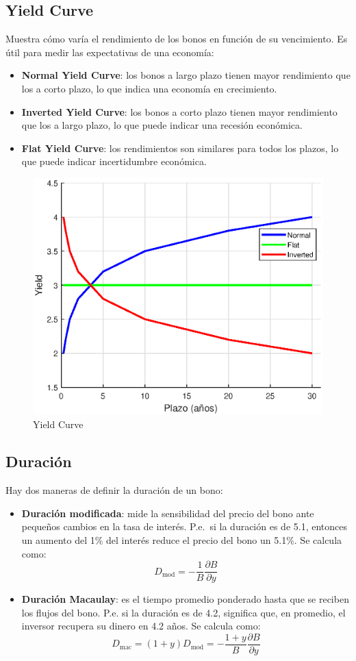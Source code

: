 \subsection{Yield Curve}
Muestra cómo varía el rendimiento de los bonos en función de su vencimiento. Es útil para medir las expectativas de una economía:
\begin{itemize}
    \item \textbf{Normal Yield Curve}: los bonos a largo plazo tienen mayor rendimiento que los a corto plazo, lo que indica una economía en crecimiento.
    \item \textbf{Inverted Yield Curve}: los bonos a corto plazo tienen mayor rendimiento que los a largo plazo, lo que puede indicar una recesión económica.
    \item \textbf{Flat Yield Curve}: los rendimientos son similares para todos los plazos, lo que puede indicar incertidumbre económica.
\end{itemize}
\begin{figure}[H]
    \centering
    \includegraphics[width=0.65\linewidth]{Imagenes/11_Prods_renta_fija/Yield_Curve.eps}
    \caption{Yield Curve}
\end{figure}




\subsection{Duración}
Hay dos maneras de definir la duración de un bono:
\begin{itemize}
    \item \textbf{Duración modificada}: mide la sensibilidad del precio del bono ante pequeños cambios en la tasa de interés. P.e.\ si la duración es de 5.1, entonces un aumento  del 1\% del interés reduce el precio del bono un 5.1\%. Se calcula como:
    \[
        \boxed{D_{\text{mod}} =  -\frac{1}{B}\frac{\partial B}{\partial y}}
    \]
    \item \textbf{Duración Macaulay}: es el tiempo promedio ponderado hasta que se reciben los flujos del bono. P.e. si la duración es de 4.2, significa que, en promedio, el inversor recupera su dinero en 4.2 años. Se calcula como:
    \[
        \boxed{D_{\text{mac}} = (1+y)D_{\text{mod}} = -\frac{1+y}{B}\frac{\partial B}{\partial y}}
    \]
\end{itemize}

